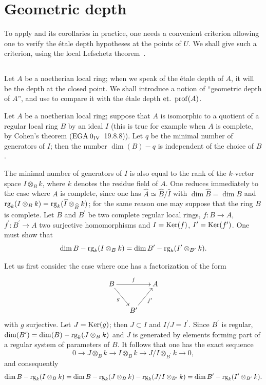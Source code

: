 \section{Geometric depth} \label{XIV.5}

To apply  and its corollaries in practice, one needs a convenient criterion allowing one to verify the \'etale depth hypotheses at the points of $U$. We shall give such a criterion, using the local Lefschetz theorem~.

\subsection{} \label{XIV.5.1} Let $A$ be a noetherian local ring; when we speak of the \'etale depth of $A$, it will be the depth at the closed point. We shall introduce a notion of ``geometric depth of $A$'', and use  to compare it with the \'etale depth $\operatorname{et.\ prof}(A)$.

\begin{proposition} \label{XIV.5.2} Let $A$ be a noetherian local ring; suppose that $A$ is isomorphic to a quotient of a regular local ring $B$ by an ideal $I$ (this is true for example when $A$ is complete, by Cohen's theorem (\textup{$\textup{EGA}\kern.2em 0_{\textup{IV}}$~19.8.8})). Let $q$ be the minimal number of generators of $I$; then the number $\dim(B)-q$ is independent of the choice of $B$.
\end{proposition}

The minimal number of generators of $I$ is also equal to the rank of the $k$-vector space $I\otimes_{B}k$, where $k$ denotes the residue field of $A$. One reduces immediately to the case where $A$ is complete, since one has $\widehat{A}\simeq\widehat{B}/\widehat{I}$ with $\dim \widehat{B}=\dim B$ and $\operatorname{rg}_{k}(I\otimes_{B}k)=\operatorname{rg}_{k}(\widehat{I}\otimes_{\widehat{B}}k)$; for the same reason one may suppose that the ring $B$ is complete. Let $B$ and $B^{\prime}$ be two complete regular local rings, $f\colon B\to A$, $f^{\prime}\colon B^{\prime}\to A$ two surjective homomorphisms and $I=\operatorname{Ker}(f)$, $I^{\prime}=\operatorname{Ker}(f^{\prime})$. One must show that
$$
\dim B-\operatorname{rg}_{k}(I\otimes_{B}k)=\dim B^{\prime}-\operatorname{rg}_{k}(I^{\prime}\otimes_{B^{\prime}}k).
$$

Let us first consider the case where one has a factorization of
the form
$$
\xymatrix@C=15pt{ B\ar[rr]^-{f}\ar[rd]_-{g} & & A\\
& B^{\prime}\ar[ru]_-{f^{\prime}} & }$$
with $g$ surjective. Let $J=\operatorname{Ker}(g)$; then $J\subset I$ and $I/J=I^{\prime}$. Since $B^{\prime}$ is regular, $\dim(B^{\prime})=\dim(B)-\operatorname{rg}_{k}(J\otimes_{B}k)$ and $J$ is generated by elements forming part of a regular system of parameters of $B$. It follows that one has the exact sequence
$$0\to J\otimes_{B}k\to I\otimes_{B}k\to J/I\otimes_{B^{\prime}}k\to 0,
$$
and consequently
$$
\dim B-\operatorname{rg}_{k}(I\otimes_{B}k)=\dim B-\operatorname{rg}_{k}(J\otimes_{B}k)-\operatorname{rg}_{k}(J/I\otimes_{B^{\prime}}k)=\dim B^{\prime}-\operatorname{rg}_{k}(I^{\prime}\otimes_{B^{\prime}}k).
$$


